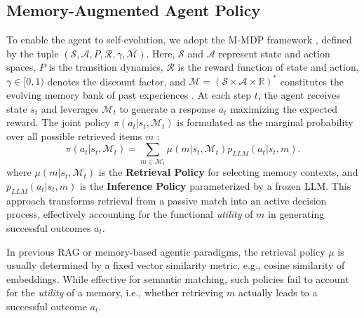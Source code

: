 \documentclass{article}
\theoremstyle{plain}
\theoremstyle{definition}
\theoremstyle{remark}
\begin{document}
\subsection{Memory-Augmented Agent Policy}
\label{sec:mmdp}
To enable the agent to self-evolution, we adopt the M-MDP framework \citep{zhou2025memento}, defined by the tuple $(\mathcal{S}, \mathcal{A}, P, \mathcal{R}, \gamma, \mathcal{M})$. Here, $\mathcal{S}$ and $\mathcal{A}$ represent state and action spaces, $P$ is the transition dynamics, $\mathcal{R}$ is the reward function of state and action, $\gamma \in [0,1)$ denotes the discount factor, and $\mathcal{M} = (\mathcal{S} \times \mathcal{A} \times \mathbb{R})^*$ constitutes the evolving memory bank of past experiences \citep{zhou2025memento}. At each step $t$, the agent receives state $s_t$ and leverages $\mathcal{M}_t$ to generate a response $a_t$ maximizing the expected reward. The joint policy $\pi(a_t | s_t, \mathcal{M}_t)$ is formulated as the marginal probability over all possible retrieved items $m$ \citep{zhou2025memento}:
\begin{equation}
\pi(a_t | s_t, \mathcal{M}_t) = \sum_{m \in \mathcal{M}_t} \mu(m | s_t, \mathcal{M}_t) p_{LLM}(a_t | s_t, m) \label{eq:joint_policy}.
\end{equation}
where $\mu(m | s_t, \mathcal{M}_t)$ is the \textbf{Retrieval Policy} for selecting memory contexts, and $p_{LLM}(a_t | s_t, m)$ is the \textbf{Inference Policy} parameterized by a frozen LLM. This approach transforms retrieval from a passive match into an active decision process, effectively accounting for the functional \emph{utility} of $m$ in generating successful outcomes $a_t$.

In previous RAG or memory-based agentic paradigms, the retrieval policy $\mu$ is usually determined by a fixed vector similarity metric, e.g., cosine similarity of embeddings. While effective for semantic matching, such policies fail to account for the \textit{utility} of a memory, i.e., whether retrieving $m$ actually leads to a successful outcome $a_t$.
\end{document}
